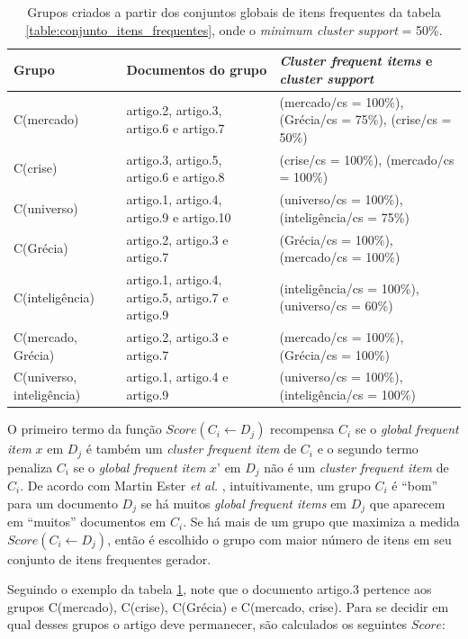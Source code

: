 \documentclass[a4paper,12pt]{article}
\begin{document}
\begin{table}[h]
\centering
\begin{tabular}{ | l | p{4cm} | p{4.5cm} | }
\hline
Grupo & Documentos do grupo & \textit{Cluster frequent items} e \textit{cluster support} \\ \hline
C(mercado)			& artigo.2, artigo.3, artigo.6 e artigo.7 & (mercado/cs = 100\%), (Grécia/cs = 75\%), (crise/cs = 50\%) \\ \hline
C(crise)                         	& artigo.3, artigo.5, artigo.6 e artigo.8 & (crise/cs = 100\%), (mercado/cs = 100\%)  \\ \hline
C(universo)			& artigo.1, artigo.4, artigo.9 e artigo.10 & (universo/cs = 100\%), (inteligência/cs = 75\%)  \\ \hline
C(Grécia)			& artigo.2, artigo.3 e artigo.7 & (Grécia/cs = 100\%), (mercado/cs = 100\%)  \\ \hline
C(inteligência)		& artigo.1, artigo.4, artigo.5, artigo.7 e artigo.9 & (inteligência/cs = 100\%), (universo/cs = 60\%)  \\ \hline
C(mercado, Grécia)		& artigo.2, artigo.3 e artigo.7 & (mercado/cs = 100\%), (Grécia/cs = 100\%)  \\ \hline
C(universo, inteligência)	& artigo.1, artigo.4 e artigo.9 & (universo/cs = 100\%), (inteligência/cs = 100\%)  \\
\hline
\end{tabular}
\caption{Grupos criados a partir dos conjuntos globais de itens frequentes da tabela \ref{table:conjunto_itens_frequentes}, onde o \textit{minimum cluster support} = 50\%.}
\label{table:grupos}
\end{table}

O primeiro termo da função $Score(C_{i} \gets D_{j})$ recompensa $C_{i}$ se o \textit{global frequent item} $x$ em $D_{j}$ é também um \textit{cluster frequent item} de $C_{i}$ e o segundo termo penaliza $C_{i}$ se o \textit{global frequent item} $x’$ em $D_{j}$ não é um \textit{cluster frequent item} de $C_{i}$. De acordo com Martin Ester \textit{et al.} \cite{Ester03}, intuitivamente, um grupo $C_{i}$ é “bom” para um documento $D_{j}$ se há muitos \textit{global frequent items} em $D_{j}$ que aparecem em “muitos” documentos em $C_{i}$. Se há mais de um grupo que maximiza a medida $Score(C_{i} \gets D_{j})$, então é escolhido o grupo com maior número de itens em seu conjunto de itens frequentes gerador.

Seguindo o exemplo da tabela \ref{table:grupos}, note que o documento artigo.3 pertence aos grupos C(mercado), C(crise), C(Grécia) e C(mercado, crise). Para se decidir em qual desses grupos o artigo deve permanecer, são calculados os seguintes $Score$:
\end{document}
